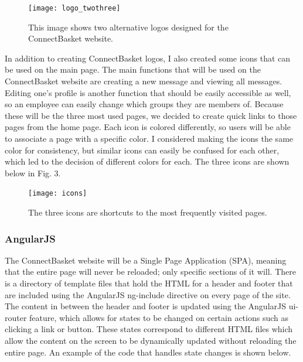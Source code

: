 \documentclass[onecolumn, draftclsnofoot,10pt, compsoc]{IEEEtran}
\begin{document}
\begin{figure}[h!]
\caption{This image shows two alternative logos designed for the ConnectBasket website.}
\texttt{[image: logo\_twothree]}
\end{figure}

In addition to creating ConnectBasket logos, I also created some icons that can be used on the main page. The main functions that will be used on the ConnectBasket website are creating a new message and viewing all messages. Editing one's profile is another function that should be easily accessible as well, so an employee can easily change which groups they are members of. Because these will be the three most used pages, we decided to create quick links to those pages from the home page. Each icon is colored differently, so users will be able to associate a page with a specific color. I considered making the icons the same color for consistency, but similar icons can easily be confused for each other, which led to the decision of different colors for each. The three icons are shown below in Fig. 3. 

\begin{figure}[h!]
\caption{The three icons are shortcuts to the most frequently visited pages.}
\texttt{[image: icons]}
\end{figure}


\subsubsection{AngularJS}
The ConnectBasket website will be a Single Page Application (SPA), meaning that the entire page will never be reloaded; only specific sections of it will. There is a directory of template files that hold the HTML for a header and footer that are included using the AngularJS ng-include directive on every page of the site. The content in between the header and footer is updated using the AngularJS ui-router feature, which allows for states to be changed on certain actions such as clicking a link or button. These states correspond to different HTML files which allow the content on the screen to be dynamically updated without reloading the entire page. An example of the code that handles state changes is shown below.

\end{document}
